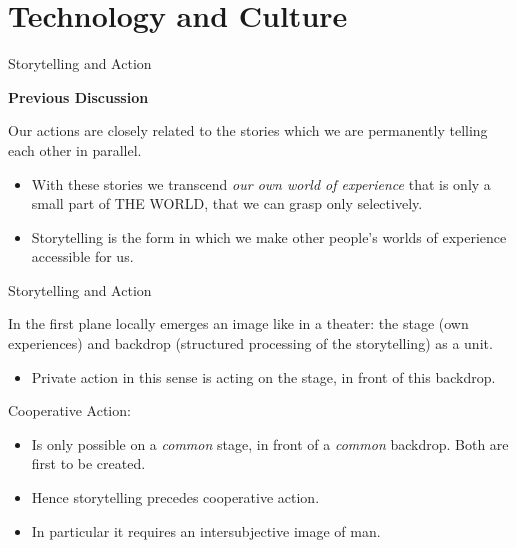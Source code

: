 \documentclass{beamer}
\title{Modelling Sustainable Systems\\ and Semantic Web\\[6pt] Information and
  Language \vskip1em}
\subtitle{Lecture in the Module 10-202-2309\\ for Master Computer Science}
\author{Prof. Dr. Hans-Gert Gräbe\\
\url{http://www.informatik.uni-leipzig.de/~graebe}}
\date{July 2021}
\newcommand{\ueberschrift}[1]{\begin{center}\bf #1\end{center}}
\begin{document}
{
\begin{frame}
  \titlepage
\end{frame}}

\section{Technology and Culture}
\begin{frame}{Storytelling and Action}

  \ueberschrift{Previous Discussion}
  
Our actions are closely related to the stories which we are permanently
telling each other in parallel.
\begin{itemize}
\item With these stories we transcend \emph{our own world of experience} that
  is only a small part of THE WORLD, that we can grasp only selectively.
\item Storytelling is the form in which we make other people's worlds of
  experience accessible for us.
\end{itemize}
\end{frame}
\begin{frame}{Storytelling and Action}

In the first plane locally emerges an image like in a theater: the stage (own
experiences) and backdrop (structured processing of the storytelling) as a
unit.
\begin{itemize}
\item Private action in this sense is acting on the stage, in front of this
  backdrop.
\end{itemize}

Cooperative Action:
\begin{itemize}
\item Is only possible on a \emph{common} stage, in front of a \emph{common}
  backdrop. Both are first to be created.
\item Hence storytelling precedes cooperative action.
\item In particular it requires an intersubjective image of man.
\end{itemize}
\end{frame}
\end{document}
